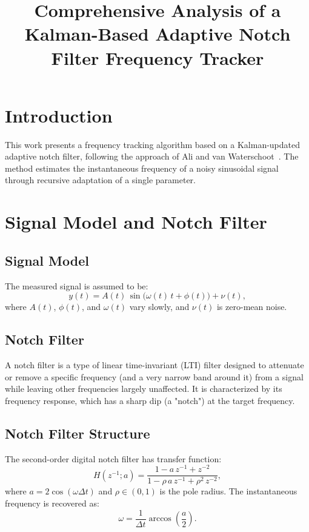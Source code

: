 \documentclass[11pt,letterpaper]{article}
\title{Comprehensive Analysis of a Kalman-Based Adaptive Notch Filter Frequency Tracker}
\author{}
\date{}
\begin{document}
\maketitle

\section{Introduction}
This work presents a frequency tracking algorithm based on a Kalman-updated adaptive notch filter, following the approach of Ali and van Waterschoot~\cite{AliWaterschoot2023}. The method estimates the instantaneous frequency of a noisy sinusoidal signal through recursive adaptation of a single parameter.

\section{Signal Model and Notch Filter}
\subsection{Signal Model}
The measured signal is assumed to be:
\begin{equation}
y(t) = A(t)\,\sin\bigl(\omega(t)\,t + \phi(t)\bigr) + \nu(t),
\label{eq:signal_model}
\end{equation}
where $A(t)$, $\phi(t)$, and $\omega(t)$ vary slowly, and $\nu(t)$ is zero-mean noise.

\subsection{Notch Filter}
A notch filter is a type of linear time-invariant (LTI) filter designed to attenuate or remove a specific frequency (and a very narrow band around it) from a signal while leaving other frequencies largely unaffected. It is characterized by its frequency response, which has a sharp dip (a "notch") at the target frequency.

\subsection{Notch Filter Structure}
The second-order digital notch filter has transfer function:
\begin{equation}
H(z^{-1};a) = \frac{1 - a\,z^{-1} + z^{-2}}{1 - \rho\,a\,z^{-1} + \rho^2\,z^{-2}},
\label{eq:notch_tf}
\end{equation}
where $a = 2\cos(\omega \Delta t)$ and $\rho \in (0,1)$ is the pole radius. The instantaneous frequency is recovered as:
\begin{equation}
\omega = \frac{1}{\Delta t}\arccos\!\left(\frac{a}{2}\right).
\label{eq:freq_estimate}
\end{equation}
\end{document}
